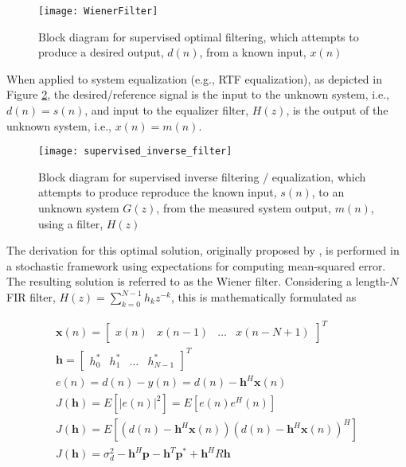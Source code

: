 \begin{figure}[H]
	\texttt{[image: WienerFilter]}
	\centering
	\caption{Block diagram for supervised optimal filtering, which attempts to produce a desired output, $d(n)$, from a known input, $x(n)$}
	\label{fig:WienerFilterProblem}
\end{figure}

When applied to system equalization (e.g., RTF equalization), as depicted in Figure \ref{fig:supervised_inverse_filter}, the desired/reference signal is the input to the unknown system, i.e., $d(n)=s(n)$, and input to the equalizer filter, $H(z)$, is the output of the unknown system, i.e., $x(n)=m(n)$. 

\begin{figure}[H]
	\texttt{[image: supervised\_inverse\_filter]}
	\centering
	\caption{Block diagram for supervised inverse filtering / equalization, which attempts to produce reproduce the known input, $s(n)$, to an unknown system $G(z)$, from the measured system output, $m(n)$, using a filter, $H(z)$}
	\label{fig:supervised_inverse_filter}
\end{figure}


The derivation for this optimal solution, originally proposed by \cite{wiener1949extrapolation}, is performed in a stochastic framework using expectations for computing mean-squared error. The resulting solution is referred to as the Wiener filter. Considering a length-$N$ FIR filter, $H(z)=\sum_{k=0}^{N-1}h_k z^{-k}$, this is mathematically formulated as

\begin{eqnarray}
	\boldsymbol{x}(n) = 
	\begin{bmatrix}
		x(n) & x(n-1) & \dots & x(n-N+1)
	\end{bmatrix}^T \\
	\boldsymbol{h} = 
	\begin{bmatrix}
		h_0^* & h_1^* & \dots & h_{N-1}^*
	\end{bmatrix}^T \\
	e(n)=d(n) - y(n) = d(n) - \boldsymbol{h}^H\boldsymbol{x}(n) \\
	J(\boldsymbol{h}) = E\left[ \left| e(n) \right|^2 \right] = E\left[e(n)e^H(n)\right] \\
	J(\boldsymbol{h}) = E\left[
	\left(d(n) - \boldsymbol{h}^H\boldsymbol{x}(n)\right)
	\left(d(n) - \boldsymbol{h}^H\boldsymbol{x}(n)\right)^H
	\right] \label{eq:wiener_cost_fn_0} \\
	J(\boldsymbol{h}) = \sigma_d^2 - \boldsymbol{h}^H\boldsymbol{p} - \boldsymbol{h}^T\boldsymbol{p}^*+\boldsymbol{h}^H R \boldsymbol{h} \label{eq:wiener_quadratic}
\end{eqnarray}

